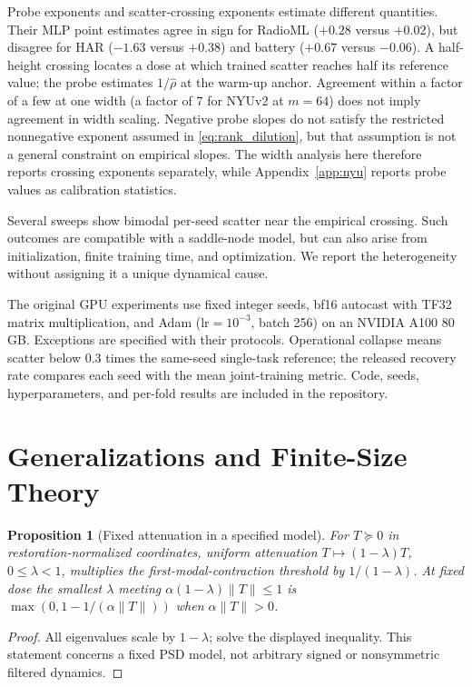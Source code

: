 \documentclass{article}
\newtheorem{proposition}{Proposition}
\begin{document}
Probe exponents and scatter-crossing exponents estimate different quantities. Their MLP point estimates agree in sign for RadioML ($+0.28$ versus $+0.02$), but disagree for HAR ($-1.63$ versus $+0.38$) and battery ($+0.67$ versus $-0.06$). A half-height crossing locates a dose at which trained scatter reaches half its reference value; the probe estimates $1/\hat\rho$ at the warm-up anchor. Agreement within a factor of a few at one width (a factor of $7$ for NYUv2 at $m=64$) does not imply agreement in width scaling. Negative probe slopes do not satisfy the restricted nonnegative exponent assumed in \eqref{eq:rank_dilution}, but that assumption is not a general constraint on empirical slopes. The width analysis here therefore reports crossing exponents separately, while Appendix~\ref{app:nyu} reports probe values as calibration statistics.

Several sweeps show bimodal per-seed scatter near the empirical crossing. Such outcomes are compatible with a saddle-node model, but can also arise from initialization, finite training time, and optimization. We report the heterogeneity without assigning it a unique dynamical cause.

The original GPU experiments use fixed integer seeds, bf16 autocast with TF32 matrix multiplication, and Adam ($\mathrm{lr}=10^{-3}$, batch 256) on an NVIDIA A100 80\,GB. Exceptions are specified with their protocols. Operational collapse means scatter below $0.3$ times the same-seed single-task reference; the released recovery rate compares each seed with the mean joint-training metric. Code, seeds, hyperparameters, and per-fold results are included in the repository.

\section{Generalizations and Finite-Size Theory}\label{app:general}

\begin{proposition}[Fixed attenuation in a specified model]\label{prop:attenuation}
For $T\succeq0$ in restoration-normalized coordinates, uniform attenuation $T\mapsto(1-\lambda)T$, $0\le\lambda<1$, multiplies the first-modal-contraction threshold by $1/(1-\lambda)$. At fixed dose the smallest $\lambda$ meeting $\alpha(1-\lambda)\|T\|\le1$ is $\max(0,1-1/(\alpha\|T\|))$ when $\alpha\|T\|>0$.
\end{proposition}
\begin{proof}
All eigenvalues scale by $1-\lambda$; solve the displayed inequality. This statement concerns a fixed PSD model, not arbitrary signed or nonsymmetric filtered dynamics.
\end{proof}
\end{document}
